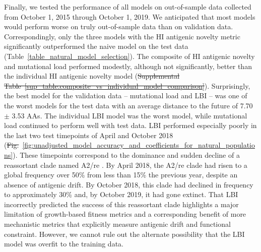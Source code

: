 \documentclass[9pt,lineno]{elife} %
\providecommand{\DIFadd}[1]{{\protect\color{blue}\uwave{#1}}} %
\providecommand{\DIFdel}[1]{{\protect\color{red}\sout{#1}}}                      %
\providecommand{\DIFaddbegin}{} %
\providecommand{\DIFaddend}{} %
\providecommand{\DIFdelbegin}{} %
\providecommand{\DIFdelend}{} %
\providecommand{\DIFaddtex}[1]{{\protect\color{blue}\uwave{#1}}} %
\providecommand{\DIFdeltex}[1]{{\protect\color{red}\sout{#1}}}                      %
\providecommand{\DIFaddbegin}{} %
\providecommand{\DIFaddend}{} %
\providecommand{\DIFdelbegin}{} %
\providecommand{\DIFdelend}{} %
\providecommand{\DIFadd}[1]{\texorpdfstring{\DIFaddtex{#1}}{#1}} %
\providecommand{\DIFdel}[1]{\texorpdfstring{\DIFdeltex{#1}}{}} %
\newcommand{\DIFscaledelfig}{0.5}
\newlength{\DIFdelgraphicswidth} %
\newlength{\DIFdelgraphicsheight} %
\newcommand{\DIFaddincludegraphics}[2][]{{\color{blue}\fbox{\DIFOincludegraphics[#1]{#2}}}} %
\newcommand{\DIFdelincludegraphics}[2][]{%
\sbox{\DIFdelgraphicsbox}{\DIFOincludegraphics[#1]{#2}}%
\settoboxwidth{\DIFdelgraphicswidth}{\DIFdelgraphicsbox} %
\settoboxtotalheight{\DIFdelgraphicsheight}{\DIFdelgraphicsbox} %
\scalebox{\DIFscaledelfig}{%
\parbox[b]{\DIFdelgraphicswidth}{\usebox{\DIFdelgraphicsbox}\\[-\baselineskip] \rule{\DIFdelgraphicswidth}{0em}}\llap{\resizebox{\DIFdelgraphicswidth}{\DIFdelgraphicsheight}{%
\setlength{\unitlength}{\DIFdelgraphicswidth}%
\begin{picture}(1,1)%
\thicklines\linethickness{2pt} %
{\color[rgb]{1,0,0}\put(0,0){\framebox(1,1){}}}%
{\color[rgb]{1,0,0}\put(0,0){\line( 1,1){1}}}%
{\color[rgb]{1,0,0}\put(0,1){\line(1,-1){1}}}%
\end{picture}%
}\hspace*{3pt}}} %
} %
\DeclareRobustCommand{\DIFaddbegin}{\DIFOaddbegin \let\includegraphics\DIFaddincludegraphics} %
\DeclareRobustCommand{\DIFaddend}{\DIFOaddend \let\includegraphics\DIFOincludegraphics} %
\DeclareRobustCommand{\DIFdelbegin}{\DIFOdelbegin \let\includegraphics\DIFdelincludegraphics} %
\DeclareRobustCommand{\DIFdelend}{\DIFOaddend \let\includegraphics\DIFOincludegraphics} %
\begin{document}
Finally, we tested the performance of all models on out-of-sample data collected from October 1, 2015 through October 1, 2019.
We anticipated that most models would perform worse on truly out-of-sample data than on validation data.
Correspondingly, only the three models with the HI antigenic novelty metric significantly outperformed the naive model on the test data (Table~\ref{table_natural_model_selection}).
The composite of HI antigenic novelty and mutational load performed modestly, although not significantly, better than the individual HI antigenic novelty model (\DIFdelbegin \DIFdel{Supplemental Table~\ref{sup_table:composite_vs_individual_model_comparison}}\DIFdelend \DIFaddbegin \DIFadd{Table~\ref{table:composite_vs_individual_model_comparison}}\DIFaddend ).
Surprisingly, the best model for the validation data -- mutational load and LBI -- was one of the worst models for the test data with an average distance to the future of 7.70 $\pm$ 3.53 AAs.
The individual LBI model was the worst model, while mutational load continued to perform well with test data.
LBI performed especially poorly in the last two test timepoints of April and October 2018 (\DIFdelbegin \DIFdel{Fig.}\DIFdelend \DIFaddbegin \DIFadd{Figure}\DIFaddend ~\ref{fig:unadjusted_model_accuracy_and_coefficients_for_natural_populations}).
These timepoints correspond to the dominance and sudden decline of a reassortant clade named A2/re \DIFdelbegin %
\DIFdelend \DIFaddbegin \citep{Potter2019}\DIFaddend .
By April 2018, the A2/re clade had risen to a global frequency over 50\% from less than 15\% the previous year, despite an absence of antigenic drift.
By October 2018, this clade had declined in frequency to approximately 30\% and, by October 2019, it had gone extinct.
That LBI incorrectly predicted the success of this reassortant clade highlights a major limitation of growth-based fitness metrics and a corresponding benefit of more mechanistic metrics that explicitly measure antigenic drift and functional constraint.
However, we cannot rule out the alternate possibility that the LBI model was overfit to the training data.
\end{document}
